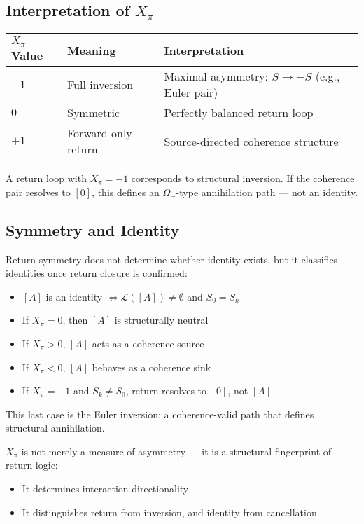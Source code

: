 \subsection{Interpretation of $X_\pi$} \label{interpretation-of-xpi}

\begin{center}
\begin{tabular}{>{\raggedright}p{2.5cm} >{\raggedright}p{4cm} >{\raggedright\arraybackslash}p{7cm}}
\toprule
\textbf{$X_\pi$ Value} & \textbf{Meaning} & \textbf{Interpretation} \\
\midrule
$-1$ & Full inversion & Maximal asymmetry: $S \rightarrow -S$ (e.g., Euler pair) \\
$0$ & Symmetric & Perfectly balanced return loop \\
$+1$ & Forward-only return & Source-directed coherence structure \\
\bottomrule
\end{tabular}
\end{center}

A return loop with $X_\pi = -1$ corresponds to structural inversion.  
If the coherence pair resolves to $[0]$, this defines an $\Omega_-$-type annihilation path — not an identity.

\subsection*{Symmetry and Identity} \label{symmetry-and-identity}

Return symmetry does not determine whether identity exists, but it classifies identities once return closure is confirmed:
\begin{itemize}
  \item $[A]$ is an identity $\iff \mathcal{L}([A]) \neq \emptyset$ and $S_0 = S_k$
  \item If $X_\pi = 0$, then $[A]$ is structurally neutral
  \item If $X_\pi > 0$, $[A]$ acts as a coherence source
  \item If $X_\pi < 0$, $[A]$ behaves as a coherence sink
  \item If $X_\pi = -1$ and $S_k \neq S_0$, return resolves to $[0]$, not $[A]$
\end{itemize}

This last case is the Euler inversion: a coherence-valid path that defines structural annihilation.

$X_\pi$ is not merely a measure of asymmetry — it is a structural fingerprint of return logic:
\begin{itemize}
  \item It determines interaction directionality
  \item It distinguishes return from inversion, and identity from cancellation
\end{itemize}

